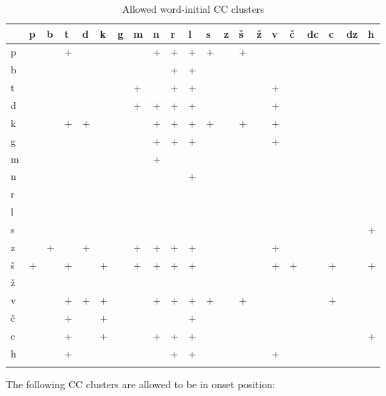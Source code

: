 \begin{table}[h!]
	\small \centering
	\caption{Allowed word-initial CC clusters}
	\begin{tabularx}{\textwidth}{YMMMMMMMMMMMMMMMMMMMM}
		\toprule
		&p&b&t&d&k&g&m&n&r&l&s&z&\v{s}&\v{z}&v&\v{c}&dc&c&dz&h\\
		\midrule
		p&&&+&&&&&+&+&+&+&&+&&&&&&&\\
		b&&&&&&&&&+&+&&&&&&&&&&\\
		t&&&&&&&+&&+&+&&&&&+&&&&&\\
		d&&&&&&&+&+&+&+&&&&&+&&&&&\\
		k&&&+&+&&&&+&+&+&+&&+&&+&&&&&\\
		g&&&&&&&&+&+&+&&&&&+&&&&&\\
		m&&&&&&&&+&&&&&&&&&&&&\\
		n&&&&&&&&&&+&&&&&&&&&&\\
		r&&&&&&&&&&&&&&&&&&&&\\
		l&&&&&&&&&&&&&&&&&&&&\\
		s&&&&&&&&&&&&&&&&&&&&+\\
		z&&+&&+&&&+&+&+&+&&&&&+&&&&&\\
		\v{s}&+&&+&&+&&+&+&+&+&&&&&+&+&&+&&+\\
		\v{z}&&&&&&&&&&&&&&&&&&&&\\
		v&&&+&+&+&&&+&+&+&+&&+&&&&&+&&\\
		\v{c}&&&+&&+&&&&&+&&&&&&&&&&\\
		c&&&+&&+&&&+&+&+&&&&&&&&&&+\\
		h&&&+&&&&&&+&+&&&&&+&&&&&\\
		\bottomrule
		\addlinespace
	\end{tabularx}
\end{table}

\par The following CC clusters are allowed to be in onset position:

